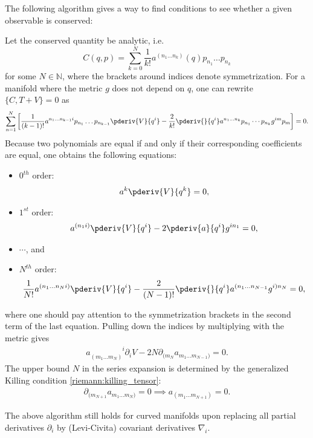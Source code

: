     The following algorithm gives a way to find conditions to see whether a given observable is conserved:
    \begin{method}
        Let the conserved quantity be analytic, i.e. \[C(q,p) = \sum_{k=0}^N\frac{1}{k!}a^{(n_1\ldots n_k)}(q)p_{n_1}\ldots p_{n_k}\] for some $N\in\mathbb{N}$, where the brackets around indices denote symmetrization. For a manifold where the metric $g$ does not depend on $q$, one can rewrite $\{C,T+V\} = 0$ as \[\sum_{n=1}^N\left[\frac{1}{(k-1)!}a^{n_1\ldots n_{k-1}i}p_{n_1}\ldots p_{n_{k-1}}\pderiv{V}{q^i} - \frac{2}{k!}\pderiv{}{q^i}a^{n_1\ldots n_k}p_{n_1}\cdots p_{n_k}g^{im}p_m\right] = 0.\] Because two polynomials are equal if and only if their corresponding coefficients are equal, one obtains the following equations:
        \begin{itemize}
            \item $0^{th}$ order:
                \begin{gather}
                    a^k\pderiv{V}{q^k} = 0,
                \end{gather}
            \item $1^{st}$ order:
                \begin{gather}
                    a^{(n_1i)}\pderiv{V}{q^i} - 2\pderiv{a}{q^i}g^{in_1} = 0,
                \end{gather}
            \item $\cdots$, and
            \item $N^{th}$ order:
                \begin{gather}
                    \frac{1}{N!}a^{(n_1\ldots n_Ni)}\pderiv{V}{q^i} - \frac{2}{(N-1)!}\pderiv{}{q^i}a^{(n_1\ldots n_{N-1}}g^{i)n_N} = 0,
                \end{gather}
        \end{itemize}
        where one should pay attention to the symmetrization brackets in the second term of the last equation. Pulling down the indices by multiplying with the metric gives
        \begin{gather}
            a_{(m_1\ldots m_N)}^{\phantom{(m_1\ldots m_N)}i}\partial_iV - 2N\partial_{(m_N}a_{m_1\ldots m_{N-1})} = 0.
        \end{gather}
        The upper bound $N$ in the series expansion is determined by the generalized Killing condition \eqref{riemann:killing_tensor}:
        \begin{gather}
            \partial_{(m_{N+1}}a_{m_1\ldots m_N)} = 0\implies a_{(m_1\ldots m_{N+1})} = 0.
        \end{gather}
    \end{method}
    \begin{remark}
        The above algorithm still holds for curved manifolds upon replacing all partial derivatives $\partial_i$ by (Levi-Civita) covariant derivatives $\nabla_i$.
    \end{remark}

